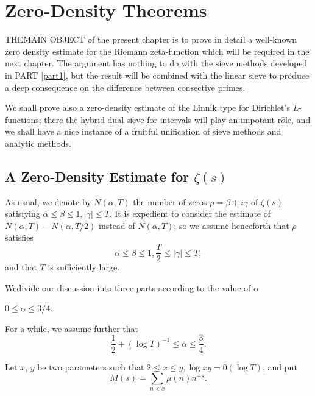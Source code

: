 \chapter{Zero-Density Theorems}\label{chap5}%

THE\pageoriginale MAIN OBJECT of the present chapter is to prove in detail a
well-known zero density estimate for the Riemann zeta-function which
will be required in the next chapter. The argument has nothing to do
with the sieve methods developed in PART \ref{part1}, but the result will be
combined with the linear sieve to produce a deep consequence on the
difference between consective primes. 

We shall prove also a zero-density estimate of the Linnik type for
Dirichlet's $L$-functions; there the hybrid dual sieve for intervals
will play an impotant r$\hat{o}$le, and we shall have a nice instance
of a fruitful unification of sieve methods and analytic methods. 

\section{A Zero-Density Estimate for
  $\zeta(s)$}\label{chap5-sec5.1}%

As usual, we denote by $N(\alpha, T)$ the number of zeros $\rho =
\beta + i \gamma$ of $\zeta (s)$ satisfying $\alpha \leq \beta \leq 1,
| \gamma |  \leq T$. It is expedient to consider the estimate of $N
(\alpha, T) - N (\alpha, T/2)$ instead of $N (\alpha,  T)$; so we
assume henceforth that $\rho$ satisfies  
\begin{equation*}
 \alpha \leq \beta \leq 1, \frac{T}{2} \leq | \gamma | \leq T,
 \tag{5.1.1}\label{eq5.1.1} 
\end{equation*}
and that $T$ is sufficiently large.

We\pageoriginale divide our discussion into three parts according to
the value of $\alpha$ 

\begin{Case}\label{chap5-case1}%
$0 \leq \alpha \leq 3/4$.
\end{Case}

For a while, we assume further that 
\begin{equation*}
  \frac{1}{2} + (\log T)^{-1} \leq \alpha \leq
  \frac{3}{4}. \tag{5.1.2}\label{eq5.1.2} 
\end{equation*}

Let $x$, $y$ be two parameters such that $2 \leq x \leq y, \log xy = 0
(\log T)$, and put   
$$
M(s) = \sum_{n < x} \mu(n)n^{-s}.
$$


